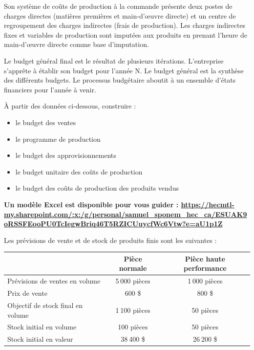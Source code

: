 \documentclass[oneside]{kaobook}
\begin{document}
Son système de coûts de production à la commande présente deux postes de charges directes (matières premières et main-d’œuvre directe) et un centre de regroupement des charges indirectes (frais de production). Les charges indirectes fixes et variables de production sont imputées aux produits en prenant l’heure de main-d’œuvre directe comme base d’imputation.

Le budget général final est le résultat de plusieurs itérations. L’entreprise s’apprête à établir son budget pour l’année N. Le budget général est la synthèse des différents budgets. Le processus budgétaire aboutit à un ensemble d’états financiers pour l’année à venir.

\begin{kaobox}
À partir des données ci-dessous, construire :
\begin{itemize}
\item le budget des ventes
\item le programme de production
\item le budget des approvisionnements
\item le budget unitaire des coûts de production
\item le budget des coûts de production des produits vendus
\end{itemize}

\textbf{Un modèle Excel est disponible pour vous guider : \url{https://hecmtl-my.sharepoint.com/:x:/g/personal/samuel\_sponem\_hec\_ca/ESUAK9oRSSFEooPU0TcIegwBriq46T5RZICUuycfWc6Vtw?e=aU1p1Z}}
\end{kaobox}

Les prévisions de vente et de stock de produits finis sont les suivantes :

\begin{center}
\footnotesize
\begin{tabular}{l c c}
 & Pièce normale & Pièce haute performance\\
\hline
Prévisions de ventes en volume & 5 000 pièces & 1 000 pièces\\
Prix de vente & 600 \$ & 800 \$\\
Objectif de stock final en volume & 1 100 pièces & 50 pièces\\
Stock initial en volume & 100 pièces & 50 pièces\\
Stock initial en valeur & 38 400 \$ & 26 200 \$\\
\end{tabular}
\end{center}
\end{document}
